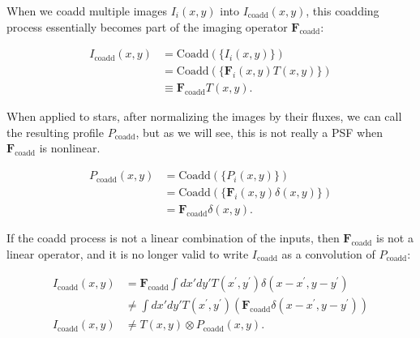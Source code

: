 \documentclass{openjournal}
\begin{document}
When we coadd multiple images $I_i(x,y)$ into $I_\mathrm{coadd}(x,y)$, this coadding process
essentially becomes part of the imaging operator $\mathbf{F}_\mathrm{coadd}$:
\begin{linenomath}\begin{align}
    I_\mathrm{coadd}(x,y) &= \mathrm{Coadd} \left( \{ I_i(x,y) \} \right) \nonumber\\
    &= \mathrm{Coadd} \left( \{ \mathbf{F}_i(x,y) T(x,y) \} \right) \nonumber\\
    &\equiv \mathbf{F}_\mathrm{coadd} T(x,y).
\end{align}\end{linenomath}
When applied to stars, after normalizing the images by their fluxes,
we can call the resulting profile $P_\mathrm{coadd}$, but as we will see, this is
not really a PSF when $\mathbf{F}_\mathrm{coadd}$ is nonlinear.
\begin{linenomath}\begin{align}
    P_\mathrm{coadd}(x,y) &= \mathrm{Coadd} \left( \{ P_i(x,y) \} \right) \nonumber\\
    &= \mathrm{Coadd} \left( \{ \mathbf{F}_i(x,y) \delta(x,y) \} \right) \nonumber\\
    &= \mathbf{F}_\mathrm{coadd} \delta(x,y).
\end{align}\end{linenomath}
If the coadd process is not a linear combination of the inputs, 
then $\mathbf{F}_\mathrm{coadd}$ is not a linear operator, and it is no longer valid to
write $I_\mathrm{coadd}$ as a convolution of $P_\mathrm{coadd}$:
\begin{linenomath}\begin{align}
    I_\mathrm{coadd}(x,y) &= \mathbf{F}_\mathrm{coadd} \int dx' dy' T(x^\prime,y^\prime) \delta(x-x^\prime,y-y^\prime) \nonumber\\
    &\ne \int dx' dy' T(x^\prime,y^\prime) \left( \mathbf{F}_\mathrm{coadd} \delta(x-x^\prime,y-y^\prime) \right) \nonumber\\
    I_\mathrm{coadd}(x,y) &\ne T(x,y) \otimes P_\mathrm{coadd}(x,y).
\end{align}\end{linenomath}
\end{document}
